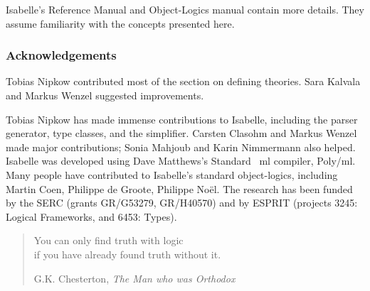 Isabelle's Reference Manual and Object-Logics manual contain more details.
They assume familiarity with the concepts presented here.


\subsubsection*{Acknowledgements} 
Tobias Nipkow contributed most of the section on defining theories.
Sara Kalvala and Markus Wenzel suggested improvements.

Tobias Nipkow has made immense contributions to Isabelle, including the
parser generator, type classes, and the simplifier.  Carsten Clasohm and
Markus Wenzel made major contributions; Sonia Mahjoub and Karin Nimmermann
also helped.  Isabelle was developed using Dave Matthews's Standard~{\sc
  ml} compiler, Poly/{\sc ml}.  Many people have contributed to Isabelle's
standard object-logics, including Martin Coen, Philippe de Groote, Philippe
No\"el.  The research has been funded by the SERC (grants GR/G53279,
GR/H40570) and by ESPRIT (projects 3245: Logical Frameworks, and 6453:
Types).

\newpage
\pagestyle{plain} \tableofcontents 
\newpage

\vspace*{2.5cm}
\begin{quote}
\raggedleft
{\sanssi
You can only find truth with logic\\
if you have already found truth without it.}\\
\bigskip

G.K. Chesterton, {\em The Man who was Orthodox}
\end{quote}

\clearfirst  \pagestyle{headings}




 \small\raggedright\frenchspacing




